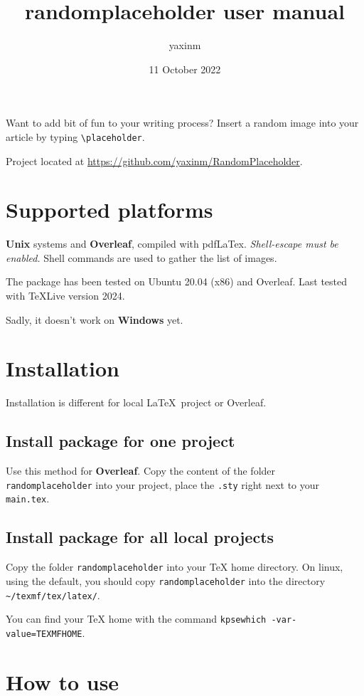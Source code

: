 \documentclass[12pt]{article}
\title{randomplaceholder user manual}
\author{yaxinm}
\date{11 October 2022}
\begin{document}
    \maketitle
    Want to add bit of fun to your writing process?
    Insert a random image into your article by typing \lstinline{\placeholder}. 
    
    Project located at \url{https://github.com/yaxinm/RandomPlaceholder}.
    
    \section{Supported platforms}
    \textbf{Unix} systems and \textbf{Overleaf}, compiled with pdfLaTex.
    \textit{Shell-escape must be enabled.} Shell commands are used to gather the list of images.

    The package has been tested on Ubuntu 20.04 (x86) and Overleaf.
	Last tested with TeXLive version 2024.
    
    Sadly, it doesn't work on \textbf{Windows} yet.


    \section{Installation}
    Installation is different for local \LaTeX~project or Overleaf.

    \subsection{Install package for one project}
    Use this method for \textbf{Overleaf}.
    Copy the content of the folder \lstinline{randomplaceholder} into your project, place the \lstinline{.sty} right next to your \lstinline{main.tex}. 
    
    \subsection{Install package for all local projects}
    Copy the folder \lstinline{randomplaceholder} into your TeX home directory. On linux, using the default, you should copy \lstinline{randomplaceholder} into the directory \lstinline{~/texmf/tex/latex/}.

    You can find your TeX home with the command \lstinline{kpsewhich -var-value=TEXMFHOME}.


    \section{How to use}
\end{document}
